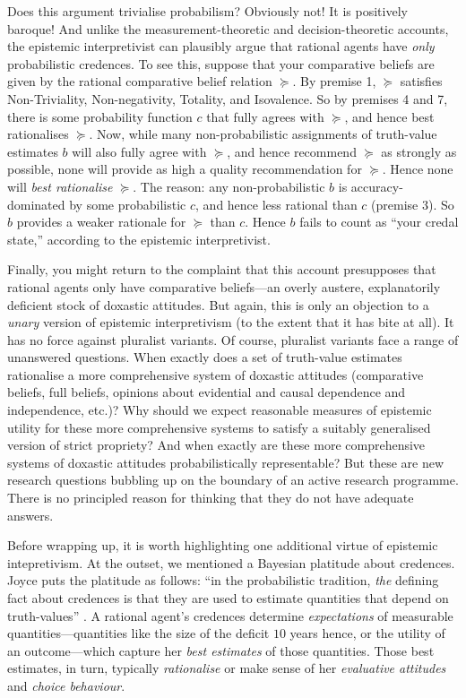 Does this argument trivialise probabilism? Obviously not! It is positively baroque! And unlike the measurement-theoretic and decision-theoretic accounts, the epistemic interpretivist can plausibly argue that rational agents have \textit{only} probabilistic credences. To see this, suppose that your comparative beliefs are given by the rational comparative belief relation $\succeq$. By premise 1, $\succeq$ satisfies Non-Triviality, Non-negativity, Totality, and Isovalence. So by premises 4 and 7, there is some probability function $c$ that fully agrees with $\succeq$, and hence best rationalises $\succeq$. Now, while many non-probabilistic assignments of truth-value estimates $b$ will also fully agree with $\succeq$, and hence recommend $\succeq$ as strongly as possible, none will provide as high a quality recommendation for $\succeq$. Hence none will \textit{best rationalise} $\succeq$. The reason: any non-probabilistic $b$ is accuracy-dominated by some probabilistic $c$, and hence less rational than $c$ (premise 3). So $b$ provides a weaker rationale for $\succeq$ than $c$. Hence $b$ fails to count as ``your credal state,'' according to the epistemic interpretivist.

Finally, you might return to the complaint that this account presupposes that rational agents only have comparative beliefs---an overly austere, explanatorily deficient stock of doxastic attitudes. But again, this is only an objection to a \textit{unary} version of epistemic interpretivism (to the extent that it has bite at all). It has no force against pluralist variants. Of course, pluralist variants face a range of unanswered questions. When exactly does a set of truth-value estimates rationalise a more comprehensive system of doxastic attitudes (comparative beliefs, full beliefs, opinions about evidential and causal dependence and independence, etc.)? Why should we expect reasonable measures of epistemic utility for these more comprehensive systems to satisfy a suitably generalised version of strict propriety? And when exactly are these more comprehensive systems of doxastic attitudes probabilistically representable? But these are new research questions bubbling up on the boundary of an active research programme. There is no principled reason for thinking that they do not have adequate answers.

Before wrapping up, it is worth highlighting one additional virtue of epistemic intepretivism. At the outset, we mentioned a Bayesian platitude about credences. Joyce puts the platitude as follows: ``in the probabilistic tradition, \textit{the} defining fact about credences is that they are used to estimate quantities that depend on truth-values'' \citep[pp. 268--9]{Joyce2009}. A rational agent's credences determine \textit{expectations} of measurable quantities---quantities like the size of the deficit $10$ years hence, or the utility of an outcome---which capture her \textit{best estimates} of those quantities. Those best estimates, in turn, typically \textit{rationalise} or make sense of her \textit{evaluative attitudes} and \textit{choice behaviour}.

